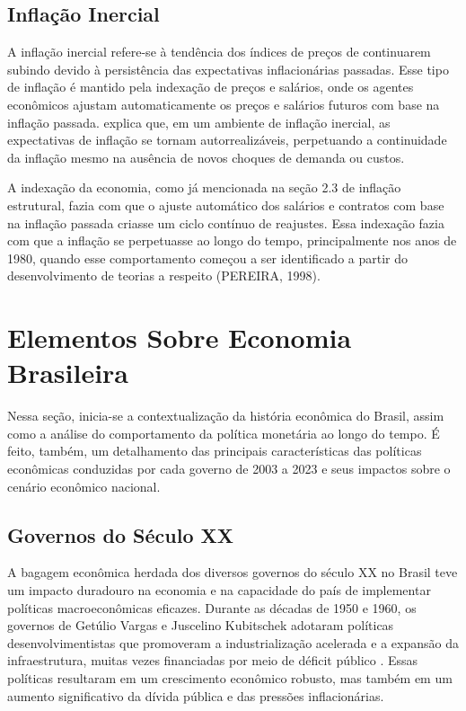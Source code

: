 \documentclass[12pt,oneside,a4paper,chapter=TITLE,english,brazil,sumario=abnt-6027-2012]{abntex2}
\begin{document}
\section{Inflação Inercial}

A inflação inercial refere-se à tendência dos índices de preços de continuarem subindo devido à persistência das expectativas inflacionárias passadas. Esse tipo de inflação é mantido pela indexação de preços e salários, onde os agentes econômicos ajustam automaticamente os preços e salários futuros com base na inflação passada.  explica que, em um ambiente de inflação inercial, as expectativas de inflação se tornam autorrealizáveis, perpetuando a continuidade da inflação mesmo na ausência de novos choques de demanda ou custos.

A indexação da economia, como já mencionada na seção 2.3 de inflação estrutural, fazia com que o ajuste automático dos salários e contratos com base na inflação passada criasse um ciclo contínuo de reajustes. Essa indexação fazia com que a inflação se perpetuasse ao longo do tempo, principalmente nos anos de 1980, quando esse comportamento começou a ser identificado a partir do desenvolvimento de teorias a respeito (PEREIRA, 1998).

\chapter{Elementos Sobre Economia Brasileira}

Nessa seção, inicia-se a contextualização da história econômica do Brasil, assim como a análise do comportamento da política monetária ao longo do tempo. É feito, também, um detalhamento das principais características das políticas econômicas conduzidas por cada governo de 2003 a 2023 e seus impactos sobre o cenário econômico nacional.

\section{Governos do Século XX}

A bagagem econômica herdada dos diversos governos do século XX no Brasil teve um impacto duradouro na economia e na capacidade do país de implementar políticas macroeconômicas eficazes. Durante as décadas de 1950 e 1960, os governos de Getúlio Vargas e Juscelino Kubitschek adotaram políticas desenvolvimentistas que promoveram a industrialização acelerada e a expansão da infraestrutura, muitas vezes financiadas por meio de déficit público \cite{bielschowsky_2022_a}. Essas políticas resultaram em um crescimento econômico robusto, mas também em um aumento significativo da dívida pública e das pressões inflacionárias.
\end{document}
